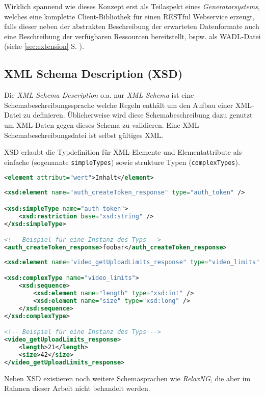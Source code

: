 Wirklich spannend wie dieses Konzept erst als Teilaspekt eines \emph{Generatorsystems}, welches eine komplette Client-Bibliothek für einen \gls{RESTful} Webservice erzeugt, falls dieser neben der abstrakten Beschreibung der erwarteten Datenformate auch eine Beschreibung der verfügbaren Ressourcen bereitstellt, bspw. als \gls{WADL}-Datei (siehe \cref{sec:extension} S. \pageref{sec:extension}).

\subsection{XML Schema Description (XSD)}

Die \emph{XML Schema Description} o.a. nur \emph{XML Schema} ist eine Schemabeschreibungssprache welche Regeln enthält um den Aufbau einer XML-Datei zu definieren. Üblicherweise wird diese Schemabeschreibung dazu genutzt um XML-Daten gegen dieses Schema zu validieren. Eine XML Schemabeschreibungsdatei ist selbst gültiges XML.

\gls{XSD} erlaubt die Typdefinition für XML-Elemente und Elementattribute als einfache (sogenannte \texttt{simpleTypes}) sowie strukture Typen (\texttt{complexTypes}).

\begin{lstlisting}[language=XML, caption=Minimalbeispiel für ein XML-Element]
<element attribut="wert">Inhalt</element>
\end{lstlisting}

\begin{lstlisting}[language=XML, label=lst:simple, caption=Beispiel für einen einfachen Schematyp \cite{facebookXSD}]
<xsd:element name="auth_createToken_response" type="auth_token" />

<xsd:simpleType name="auth_token">
    <xsd:restriction base="xsd:string" />
</xsd:simpleType>

<!-- Beispiel für eine Instanz des Typs -->
<auth_createToken_response>foobar</auth_createToken_response>
\end{lstlisting}

\begin{lstlisting}[language=XML, label=lst:complex, caption=Beispiel für einen strukturierten Schematyp \cite{facebookXSD}]
<xsd:element name="video_getUploadLimits_response" type="video_limits" />

<xsd:complexType name="video_limits">
    <xsd:sequence>
        <xsd:element name="length" type="xsd:int" />
        <xsd:element name="size" type="xsd:long" />
    </xsd:sequence>
</xsd:complexType>

<!-- Beispiel für eine Instanz des Typs -->
<video_getUploadLimits_response>
    <length>21</length>
    <size>42</size>
</video_getUploadLimits_response>
\end{lstlisting}

Neben \gls{XSD} existieren noch weitere Schemasprachen wie \emph{RelaxNG}, die aber im Rahmen dieser Arbeit nicht behandelt werden.